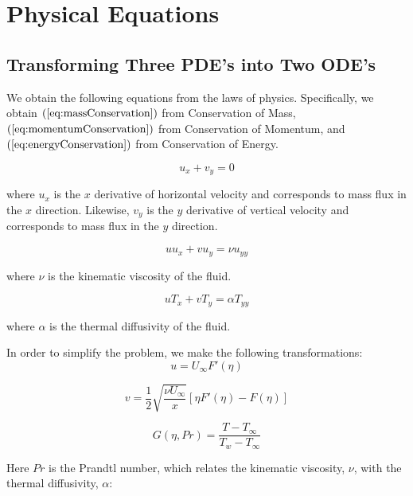 \documentclass[12pt]{article}\pagestyle{myheadings}
\theoremstyle{plain}
\begin{document}
\section{Physical Equations}
\subsection{Transforming Three PDE's into Two ODE's}
We obtain the following equations from the laws of physics. Specifically, we obtain $(\ref{eq:massConservation})$ from Conservation of Mass,$(\ref{eq:momentumConservation})$ from Conservation of Momentum, and $(\ref{eq:energyConservation})$ from Conservation of Energy.

\begin{equation}\label{eq:massConservation}
u_x + v_y = 0
\end{equation}

where $u_x$ is the $x$ derivative of horizontal velocity and corresponds to mass flux in the $x$ direction. Likewise, $v_y$ is the $y$ derivative of vertical velocity and corresponds to mass flux in the $y$ direction.

\begin{equation}\label{eq:momentumConservation}
uu_x + vu_y = \nu u_{yy} 
\end{equation}

where $\nu$ is the kinematic viscosity of the fluid.

\begin{equation}\label{eq:energyConservation}
uT_x + vT_y = \alpha T_{yy}
\end{equation}

where $\alpha$ is the thermal diffusivity of the fluid.
\vspace{5mm}

In order to simplify the problem, we make the following transformations:\\
\begin{equation}\label{eq:u}
u = U_{\infty}F'(\eta)
\end{equation}

\begin{equation}\label{eq:v}
v = \frac{1}{2} \sqrt{\frac{\nu U_{\infty}}{x}}[\eta F'(\eta) - F(\eta)]
\end{equation}

\begin{equation}\label{eq:G}
G(\eta, Pr) = \frac{T-T_{\infty}}{T_w - T_{\infty}}
\end{equation} 

Here $Pr$ is the Prandtl number, which relates the kinematic viscosity, $\nu$, with the thermal diffusivity, $\alpha$:
\end{document}
